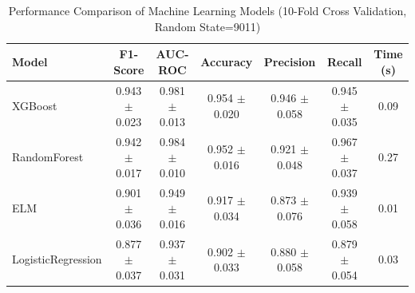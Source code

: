 \begin{table}[htbp]
\centering
\caption{Performance Comparison of Machine Learning Models (10-Fold Cross Validation, Random State=9011)}
\label{tab:model_comparison}
\begin{tabular}{lcccccc}
\toprule
\textbf{Model} & \textbf{F1-Score} & \textbf{AUC-ROC} & \textbf{Accuracy} & \textbf{Precision} & \textbf{Recall} & \textbf{Time (s)} \\
\midrule
XGBoost & 0.943 $\pm$ 0.023 & 0.981 $\pm$ 0.013 & 0.954 $\pm$ 0.020 & 0.946 $\pm$ 0.058 & 0.945 $\pm$ 0.035 & 0.09 \\
RandomForest & 0.942 $\pm$ 0.017 & 0.984 $\pm$ 0.010 & 0.952 $\pm$ 0.016 & 0.921 $\pm$ 0.048 & 0.967 $\pm$ 0.037 & 0.27 \\
ELM & 0.901 $\pm$ 0.036 & 0.949 $\pm$ 0.016 & 0.917 $\pm$ 0.034 & 0.873 $\pm$ 0.076 & 0.939 $\pm$ 0.058 & 0.01 \\
LogisticRegression & 0.877 $\pm$ 0.037 & 0.937 $\pm$ 0.031 & 0.902 $\pm$ 0.033 & 0.880 $\pm$ 0.058 & 0.879 $\pm$ 0.054 & 0.03 \\
\bottomrule
\end{tabular}
\end{table}